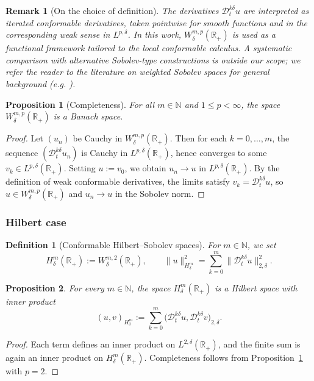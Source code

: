 \documentclass[preprint,12pt]{elsarticle}
\newtheorem{definition}{Definition}
\newtheorem{proposition}{Proposition}
\newtheorem{remark}{Remark}
\newtheorem{proof}{Proof}
\newcommand{\R}{\mathbb {R}}
\newcommand{\N}{\mathbb {N}}
\begin{document}
\begin{remark}[On the choice of definition]\label{rem:sobolev_choice}
The derivatives $\mathcal D_t^{k\delta}u$ are interpreted as iterated conformable
derivatives, taken pointwise for smooth functions and in the corresponding weak
sense in $L^{p,\delta}$.
In this work, $W^{m,p}_\delta(\R_+)$ is used as a functional framework tailored to
the local conformable calculus.
A systematic comparison with alternative Sobolev-type constructions is outside
our scope; we refer the reader to the literature on weighted Sobolev spaces for
general background (e.g. \cite{KufnerWeighted,AdamsFournier}).
\end{remark}

\begin{proposition}[Completeness]\label{prop:BanachWmp}
For all $m\in\N$ and $1\le p<\infty$, the space $W^{m,p}_\delta(\R_+)$ is a Banach space.
\end{proposition}

\begin{proof}
Let $(u_n)$ be Cauchy in $W^{m,p}_\delta(\R_+)$.
Then for each $k=0,\dots,m$, the sequence $(\mathcal D_t^{k\delta}u_n)$ is Cauchy in
$L^{p,\delta}(\R_+)$, hence converges to some $v_k\in L^{p,\delta}(\R_+)$.
Setting $u:=v_0$, we obtain $u_n\to u$ in $L^{p,\delta}(\R_+)$.
By the definition of weak conformable derivatives, the limits satisfy
$v_k=\mathcal D_t^{k\delta}u$, so $u\in W^{m,p}_\delta(\R_+)$ and $u_n\to u$ in the
Sobolev norm.
\end{proof}

\subsubsection*{Hilbert case}

\begin{definition}[Conformable Hilbert--Sobolev spaces]\label{def:Hmdelta}
For $m\in\N$, we set
\[
H_\delta^m(\R_+):=W^{m,2}_\delta(\R_+),
\qquad
\|u\|_{H_\delta^m}^2
=
\sum_{k=0}^m \|\mathcal D_t^{k\delta}u\|_{2,\delta}^2.
\]
\end{definition}

\begin{proposition}
For every $m\in\N$, the space $H_\delta^m(\R_+)$ is a Hilbert space with inner product
\[
(u,v)_{H_\delta^m}
:=
\sum_{k=0}^m
\bigl(\mathcal D_t^{k\delta}u,\mathcal D_t^{k\delta}v\bigr)_{2,\delta}.
\]
\end{proposition}

\begin{proof}
Each term defines an inner product on $L^{2,\delta}(\R_+)$, and the finite sum is
again an inner product on $H_\delta^m(\R_+)$.
Completeness follows from Proposition~\ref{prop:BanachWmp} with $p=2$.
\end{proof}
\end{document}
